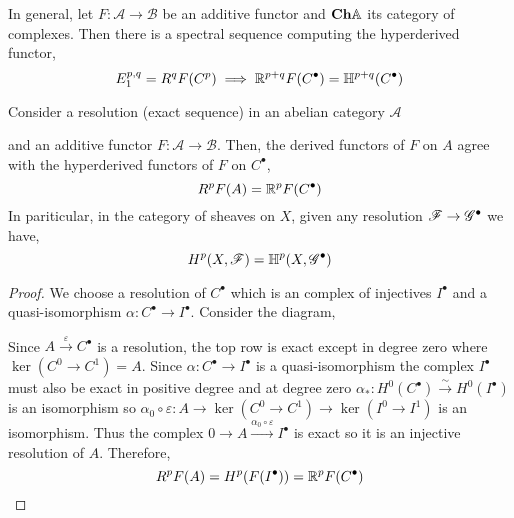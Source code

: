 \documentclass[12pt]{article}
\begin{document}
\begin{remark}
In general, let $F : \mathcal{A} \to \mathcal{B}$ be an additive functor and $\mathbf{Ch}{\mathbb{A}}$ its category of complexes. Then there is a spectral sequence computing the hyperderived functor,
\[ E_1^{p,q} = R^q F(C^p) \implies \mathbb{R}^{p+q} F(C^\bullet) = \mathbb{H}^{p + q}(C^\bullet) \] 
\end{remark}

\begin{proposition}
Consider a resolution (exact sequence) in an abelian category $\mathcal{A}$
\begin{center}
\end{center}
and an additive functor $F : \mathcal{A} \to \mathcal{B}$. Then, the derived functors of $F$ on $A$ agree with the hyperderived functors of $F$ on $C^\bullet$,
\[ R^p F(A) = \mathbb{R}^p F(C^\bullet) \]
In pariticular, in the category of sheaves on $X$, given any resolution $\mathscr{F} \to \mathscr{G}^\bullet$ we have,
\[ H^p(X, \mathscr{F}) = \mathbb{H}^p(X, \mathscr{G}^\bullet) \]
\end{proposition}

\begin{proof}
We choose a resolution of $C^\bullet$ which is an complex of injectives $I^\bullet$ and a quasi-isomorphism $\alpha : C^\bullet \to I^\bullet$. Consider the diagram,
\begin{center}
\end{center}
Since $A \xrightarrow{\varepsilon} C^\bullet$ is a resolution, the top row is exact except in degree zero where $\ker{(C^0 \to C^1)} = A$. Since $\alpha : C^\bullet \to I^\bullet$ is a quasi-isomorphism the complex $I^\bullet$ must also be exact in positive degree and at degree zero $\alpha_* : H^0(C^\bullet) \xrightarrow{\sim} H^0(I^\bullet)$ is an isomorphism so $\alpha_0 \circ \varepsilon : A \to \ker{(C^0 \to C^1)} \to \ker{(I^0 \to I^1)}$ is an isomorphism. Thus the complex $0 \to A \xrightarrow{\alpha_0 \circ \varepsilon} I^\bullet$ is exact so it is an injective resolution of $A$. Therefore,
\[ R^p F(A) = H^p(F(I^\bullet)) = \mathbb{R}^p F(C^\bullet) \] 
\end{proof}
\end{document}
